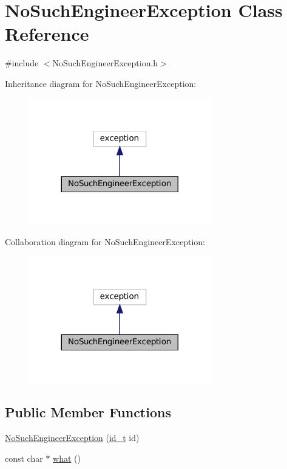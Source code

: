 \hypertarget{classNoSuchEngineerException}{}\section{No\+Such\+Engineer\+Exception Class Reference}
\label{classNoSuchEngineerException}


{\ttfamily \#include $<$No\+Such\+Engineer\+Exception.\+h$>$}



Inheritance diagram for No\+Such\+Engineer\+Exception\+:
\nopagebreak
\begin{figure}[H]
\begin{center}
\leavevmode
\includegraphics[width=224pt]{classNoSuchEngineerException__inherit__graph}
\end{center}
\end{figure}


Collaboration diagram for No\+Such\+Engineer\+Exception\+:
\nopagebreak
\begin{figure}[H]
\begin{center}
\leavevmode
\includegraphics[width=224pt]{classNoSuchEngineerException__coll__graph}
\end{center}
\end{figure}
\subsection*{Public Member Functions}
\begin{DoxyCompactItemize}
\item 
\mbox{\hyperlink{classNoSuchEngineerException_acb7d95771ea1961a2cf223d3fcedd78a}{No\+Such\+Engineer\+Exception}} (\mbox{\hyperlink{project__utils_8h_a8f3a969054ad2200720b96e7e23dd4e1}{id\+\_\+t}} id)
\item 
const char $\ast$ \mbox{\hyperlink{classNoSuchEngineerException_a8d08bc83799855bed5d9ba2fddb56b34}{what}} ()
\end{DoxyCompactItemize}


